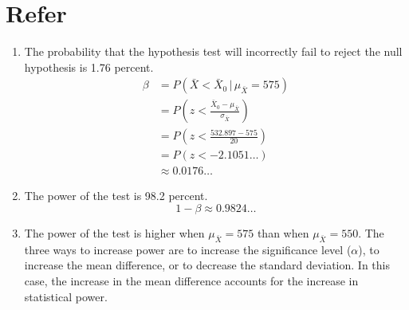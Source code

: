 \documentclass[12pt]{article}
\begin{document}
\section{Refer}
\begin{enumerate}
\item The probability that the hypothesis test will incorrectly fail to reject the null hypothesis is 1.76 percent.
\begin{align*}
\beta
&=P(\bar{X}<\bar{X}_0\,|\,\mu_{\bar{X}}=575)\\
&=P\left(z<\frac{\bar{X}_0-\mu_{\bar{X}}}{\sigma_{\bar{X}}}\right)\\
&=P\left(z<\frac{532.897-575}{20}\right)\\
&=P(z<-2.1051\dots)\\
&\approx 0.0176\dots
\end{align*}
\item The power of the test is 98.2 percent.
\[1-\beta\approx 0.9824\dots\]
\item The power of the test is higher when $\mu_{\bar{X}}=575$ than when $\mu_{\bar{X}}=550$. The three ways to increase power are to increase the significance level ($\alpha$), to increase the mean difference, or to decrease the standard deviation. In this case, the increase in the mean difference accounts for the increase in statistical power.
\end{enumerate}
\end{document}
